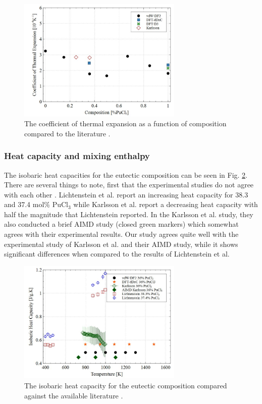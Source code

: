 \documentclass[review]{elsarticle}
\begin{document}
\begin{figure}[h!]
 \centering
 \includegraphics[width=0.7\textwidth]{CTE.jpg} 
 \caption{The coefficient of thermal expansion as a function of composition compared to the literature \cite{karlsson2022synthesis}.}
 \label{fig:CTE}
\end{figure} 

\subsubsection{Heat capacity and mixing enthalpy}

The isobaric heat capacities for the eutectic composition can be seen in Fig. \ref{fig:Cp_eut}. There are several things to note, first that the experimental studies do not agree with each other \cite{karlsson2022synthesis, lichtenstein2022property}. Lichtenstein et al. report an increasing heat capacity for 38.3 and 37.4 mol\% PuCl$_3$ while Karlsson et al. report a decreasing heat capacity with half the magnitude that Lichtenstein reported. In the Karlsson et al. study, they also conducted a brief AIMD study (closed green markers) which somewhat agrees with their experimental results. Our study agrees quite well with the experimental study of Karlsson et al. and their AIMD study, while it shows significant differences when compared to the results of Lichtenstein et al.

\begin{figure}[h!]
 \centering
 \includegraphics[width=0.7\textwidth]{Cp_eut.jpg} 
 \caption{The isobaric heat capacity for the eutectic composition compared against the available literature \cite{karlsson2022synthesis,lichtenstein2022property}.}
 \label{fig:Cp_eut}
\end{figure}
\end{document}
